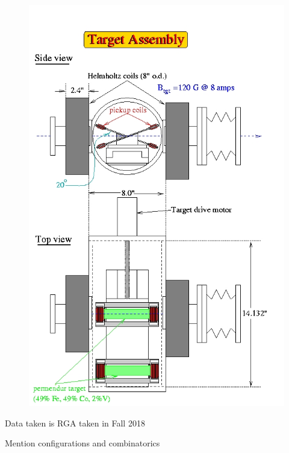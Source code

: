 			 \begin{figure}[H]
    			\centering
    			\includegraphics[width=12cm]{Chapters/Ch2-Experiment/clas-12-exp/clas-detectors/other/pics/hall-b-poll-target.jpg}
    			\caption{ }
			\end{figure}

        Data taken is RGA taken in Fall 2018

        Mention configurations and combinatorics
        